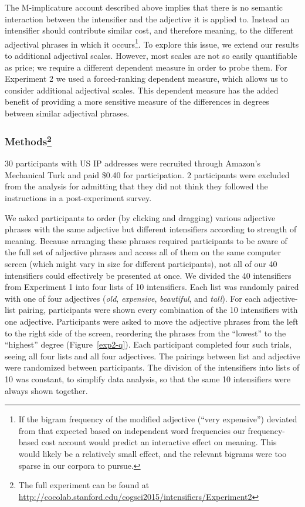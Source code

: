 \documentclass[10pt,letterpaper]{article}
\newcommand{\w}[1]{\emph{#1}}
\begin{document}
The M-implicature account described above implies that there is no semantic interaction between the intensifier and the adjective it is applied to. Instead an intensifier should contribute similar cost, and therefore meaning, to the different adjectival phrases in which it occurs\footnote{If the bigram frequency of the modified adjective (``very expensive'') deviated from that expected based on independent word frequencies our frequency-based cost account would predict an interactive effect on meaning. This would likely be a relatively small effect, and the relevant bigrams were too sparse in our corpora to pursue.}.
To explore this issue, we extend our results to additional adjectival scales. However, most scales are not so easily quantifiable as price; we require a different dependent measure in order to probe them.
For Experiment 2 we used a forced-ranking dependent measure, which allows us to consider additional adjectival scales. This dependent measure has the added benefit of providing a more sensitive measure of the differences in degrees between similar adjectival phrases.

\subsubsection{Methods\footnote{The full experiment can be found at \url{http://cocolab.stanford.edu/cogsci2015/intensifiers/Experiment2}}}

30 participants with US IP addresses were recruited through Amazon's Mechanical Turk and paid \$0.40 for  participation. 2 participants were excluded from the analysis for admitting that they did not think they followed the instructions in a post-experiment survey.

We asked participants to order (by clicking and dragging) various adjective phrases with the same adjective but different intensifiers according to strength of meaning. Because arranging these phrases required participants to be aware of the full set of adjective phrases and access all of them on the same computer screen (which might vary in size for different participants), not all of our 40 intensifiers could effectively be presented at once. We divided the 40 intensifiers from Experiment 1 into four lists of 10 intensifiers. 
Each list was randomly paired with one of four adjectives (\w{old}, \w{expensive}, \w{beautiful}, and \w{tall}).
For each adjective-list pairing, participants were shown every combination of the 10 intensifiers with one adjective.
Participants were asked to move the adjective phrases from the left to the right side of the screen, reordering the phrases from the ``lowest'' to the ``highest'' degree (Figure~\ref{exp2-q}).
Each participant completed four such trials, seeing all four lists and all four adjectives.
The pairings between list and adjective were randomized between participants.
The division of the intensifiers into lists of 10 was constant, to simplify data analysis, so that the same 10 intensifiers were always shown together.
\end{document}
